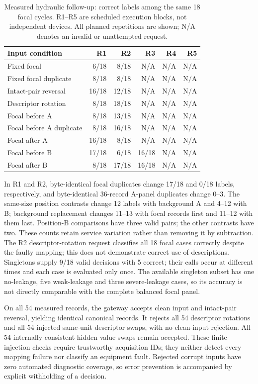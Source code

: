 \documentclass[11pt,a4paper]{article}
\begin{document}
\begin{table}[htbp]\centering\small
\caption{Measured hydraulic follow-up: correct labels among the same 18 focal cycles. R1--R5 are scheduled execution blocks, not independent devices. All planned repetitions are shown; N/A denotes an invalid or unattempted request.}
\label{tab:hydraulic}
\begin{tabular}{@{}lrrrrr@{}}\toprule
Input condition & R1 & R2 & R3 & R4 & R5 \\\midrule
Fixed focal & 6/18 & 8/18 & N/A & N/A & N/A \\
Fixed focal duplicate & 8/18 & 8/18 & N/A & N/A & N/A \\
Intact-pair reversal & 16/18 & 12/18 & N/A & N/A & N/A \\
Descriptor rotation & 8/18 & 18/18 & N/A & N/A & N/A \\
Focal before A & 8/18 & 13/18 & N/A & N/A & N/A \\
Focal before A duplicate & 8/18 & 16/18 & N/A & N/A & N/A \\
Focal after A & 16/18 & 8/18 & N/A & N/A & N/A \\
Focal before B & 17/18 & 6/18 & 16/18 & N/A & N/A \\
Focal after B & 8/18 & 17/18 & 16/18 & N/A & N/A \\
\bottomrule\end{tabular}\end{table}

In R1 and R2, byte-identical focal duplicates change 17/18 and 0/18 labels, respectively, and byte-identical 36-record A-panel duplicates change 0--3. The same-size position contrasts change 12 labels with background A and 4--12 with B; background replacement changes 11--13 with focal records first and 11--12 with them last. Position-B comparisons have three valid pairs; the other contrasts have two. These counts retain service variation rather than removing it by subtraction. The R2 descriptor-rotation request classifies all 18 focal cases correctly despite the faulty mapping; this does not demonstrate correct use of descriptions. Singletons supply 9/18 valid decisions with 5 correct; their calls occur at different times and each case is evaluated only once. The available singleton subset has one no-leakage, five weak-leakage and three severe-leakage cases, so its accuracy is not directly comparable with the complete balanced focal panel.

On all 54 measured records, the gateway accepts clean input and intact-pair reversal, yielding identical canonical records. It rejects all 54 descriptor rotations and all 54 injected same-unit descriptor swaps, with no clean-input rejection. All 54 internally consistent hidden value swaps remain accepted. These finite injection checks require trustworthy acquisition IDs; they neither detect every mapping failure nor classify an equipment fault. Rejected corrupt inputs have zero automated diagnostic coverage, so error prevention is accompanied by explicit withholding of a decision.
\end{document}
